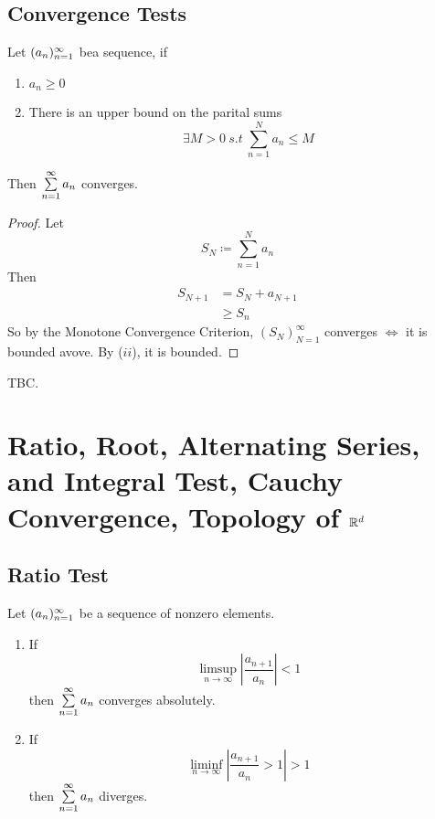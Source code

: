 \documentclass[openany]{report}
\begin{document}
\section{Convergence Tests}
\begin{prop}
    Let $({a}_n)_{n=1}^\infty$ bea  sequence, if 
    \begin{enumerate}[label=(\roman*)]
        \item $a_n \geq 0$
        \item There is an upper bound on the parital sums
        \[\exists M > 0 \ s.t \ \sum_{n=1}^N a_n \leq M\]
    \end{enumerate}
    Then $\sum\limits_{n=1}^\infty a_n$ converges.
\end{prop}
\begin{proof}
    Let 
    \[S_N \coloneqq \sum_{n=1}^N a_n\]
    Then 
    \begin{align*}
        S_{N+1} &= S_N + a_{N+1}\\ 
        &\geq S_n
    \end{align*}
    So by the Monotone Convergence Criterion, $(S_N)_{N=1}^\infty$ converges $\iff$ it is bounded avove. By ($ii$), it is bounded.
\end{proof}

\begin{prop}
    TBC. 
\end{prop}

\chapter{Ratio, Root, Alternating Series, and Integral Test, Cauchy Convergence, Topology of $\mathbb{R}^d$}
\section{Ratio Test}
\begin{prop}
    Let $({a}_n)_{n=1}^\infty$ be a sequence of nonzero elements.
    \begin{enumerate}[label=(\roman*)]
        \item If 
        \[\limsup_{n \rightarrow \infty} \left| \frac{a_{n+1}}{a_n} \right|< 1\]
        then $\sum\limits_{n=1}^\infty a_n$ converges absolutely.
        \item If 
        \[\liminf_{n\rightarrow \infty} \left| \frac{a_{n+1}}{a_n} > 1 \right| > 1\]
        then $\sum\limits_{n=1}^\infty a_n$ diverges.
    \end{enumerate}
\end{prop}
\end{document}
